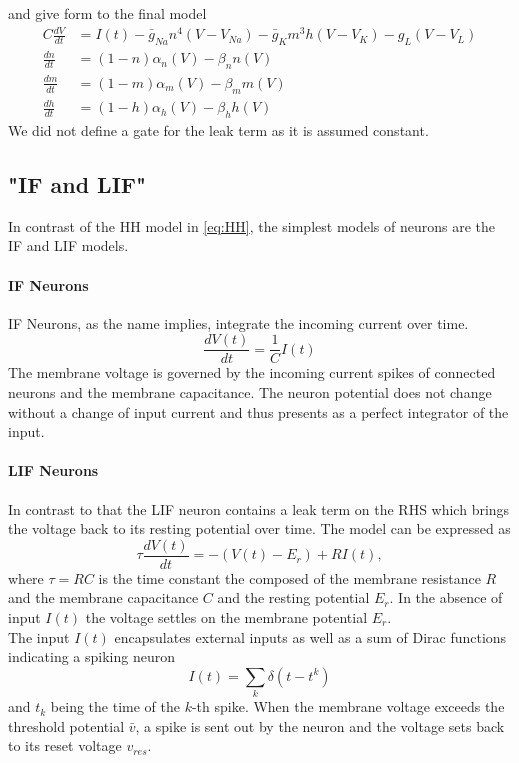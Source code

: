 and give form to the final model
\begin{equation}\label{eq:HH}
	\begin{aligned}
	C\frac{dV}{dt} &= I(t) -\bar{g}_{Na} n^4(V-V_{Na}) - \bar{g}_{K} m^3h(V-V_{K}) -g_L(V-V_{L})\\
	\frac{dn}{dt} &= (1-n)\alpha_n(V) - \beta_n n (V)\\
	\frac{dm}{dt} &= (1-m)\alpha_m(V) - \beta_m m (V)\\
	\frac{dh}{dt} &= (1-h)\alpha_h(V) - \beta_h h (V)
	\end{aligned}
\end{equation}
We did not define a gate for the leak term as it is assumed constant.
\subsection{"IF and LIF"}
In contrast of the \ac{HH} model in \cref{eq:HH}, the simplest models of neurons are the \ac{IF} and \ac{LIF} models.\\
\paragraph{IF Neurons}
\ac{IF} Neurons, as the name implies, integrate the incoming current over time.
\begin{equation}
	\frac{d V(t)}{d t} = \frac{1}{C}I(t)
\end{equation}
The membrane voltage is governed by the incoming current spikes of connected neurons and the membrane capacitance. The neuron potential does not change without a change of input current and thus presents as a perfect integrator of the input.\\
\paragraph{\ac{LIF} Neurons}
In contrast to that the \ac{LIF} neuron contains a leak term on the RHS which brings the voltage back to its resting potential over time. The model can be expressed as
\begin{equation}
	\tau\frac{dV(t)}{dt} = -(V(t)-E_r) + RI(t),
\end{equation}
where $\tau = RC$ is the time constant the composed of the membrane resistance $R$ and the membrane capacitance $C$ and the resting potential $E_r$. In the absence of input $I(t)$ the voltage settles on the membrane potential $E_r$.\\
The input $I(t)$ encapsulates external inputs as well as a sum of Dirac functions indicating a spiking neuron
\begin{equation}
	I(t) = \sum_k \delta(t-t^k)
\end{equation}
and $t_k$ being the time of the $k$-th spike. When the membrane voltage exceeds the threshold potential $\bar{v}$, a spike is sent out by the neuron and the voltage sets back to its reset voltage $v_{res}$.
